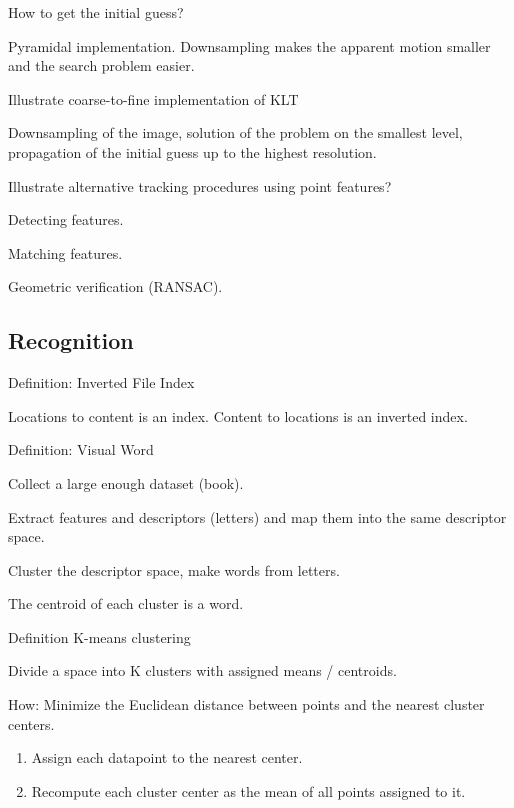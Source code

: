 \documentclass[10pt,a4paper]{scrartcl}
\begin{document}
\begin{multicols*}{2}
\begin{QandA}
{How to get the initial guess?}
\item Pyramidal implementation. Downsampling makes the apparent motion smaller and the search problem easier.
\end{QandA}

\begin{QandA}
{Illustrate coarse-to-fine implementation of KLT}
\item Downsampling of the image, solution of the problem on the smallest level, propagation of the initial guess up to the highest resolution.
\end{QandA}

\begin{QandA}
{Illustrate alternative tracking procedures using point features?}
\item Detecting features.
\item Matching features.
\item Geometric verification (RANSAC).
\end{QandA}

\subsection*{Recognition}

\begin{QandA}
{Definition: Inverted File Index}
\item Locations to content is an index. Content to locations is an inverted index. 
\end{QandA}

\begin{QandA}
{Definition: Visual Word}
\item Collect a large enough dataset (book).
\item Extract features and descriptors (letters) and map them into the same descriptor space.
\item Cluster the descriptor space, make words from letters.
\item The centroid of each cluster is a word.
\end{QandA}

\begin{QandA}
{Definition K-means clustering}
\item Divide a space into K clusters with assigned means / centroids.
\item How: Minimize the Euclidean distance between points and the nearest cluster centers.
\begin{enumerate}
\item Assign each datapoint to the nearest center.
\item Recompute each cluster center as the mean of all points assigned to it.
\end{enumerate}
\end{QandA}


\end{multicols*}
\end{document}
